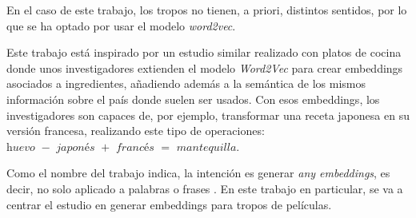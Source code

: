 En el caso de este trabajo, los tropos no tienen, a priori, distintos sentidos, por lo que se ha optado
por usar el modelo \emph{word2vec}.

Este trabajo está inspirado por un estudio similar realizado con platos
de cocina \cite{kazama2018neural} donde unos investigadores extienden el modelo \textit{Word2Vec} para crear embeddings asociados a
ingredientes, añadiendo además a la semántica de los mismos información sobre el país donde suelen ser usados. Con esos embeddings,
los investigadores son capaces de, por ejemplo, transformar una receta japonesa en su versión francesa, realizando este tipo de operaciones:
$\textit{huevo }- \textit{ japonés } + \textit{ francés } = \textit{ mantequilla}$.

Como el nombre del trabajo indica, la intención es generar \textit{any embeddings}, es decir, no solo aplicado a
palabras \cite{word2vec:1} \cite{word2vec:2} o frases \cite{kiros2015skip}. En este trabajo en particular, se va a centrar
el estudio en generar embeddings para tropos de películas.